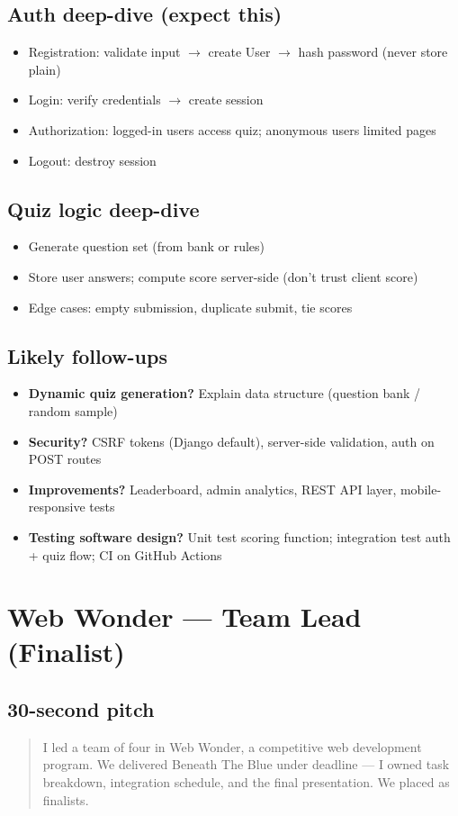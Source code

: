 \documentclass[11pt,a4paper]{article}
\newcommand{\Say}[1]{\begin{quote}\small #1\end{quote}}
\begin{document}
\subsection{Auth deep-dive (expect this)}
\begin{itemize}
  \item Registration: validate input $\rightarrow$ create User $\rightarrow$ hash password (never store plain)
  \item Login: verify credentials $\rightarrow$ create session
  \item Authorization: logged-in users access quiz; anonymous users limited pages
  \item Logout: destroy session
\end{itemize}

\subsection{Quiz logic deep-dive}
\begin{itemize}
  \item Generate question set (from bank or rules)
  \item Store user answers; compute score server-side (don't trust client score)
  \item Edge cases: empty submission, duplicate submit, tie scores
\end{itemize}

\subsection{Likely follow-ups}
\begin{itemize}
  \item \textbf{Dynamic quiz generation?} Explain data structure (question bank / random sample)
  \item \textbf{Security?} CSRF tokens (Django default), server-side validation, auth on POST routes
  \item \textbf{Improvements?} Leaderboard, admin analytics, REST API layer, mobile-responsive tests
  \item \textbf{Testing software design?} Unit test scoring function; integration test auth + quiz flow; CI on GitHub Actions
\end{itemize}

\section{Web Wonder --- Team Lead (Finalist)}
\subsection{30-second pitch}
\Say{I led a team of four in Web Wonder, a competitive web development program. We delivered Beneath The Blue under deadline --- I owned task breakdown, integration schedule, and the final presentation. We placed as finalists.}
\end{document}
